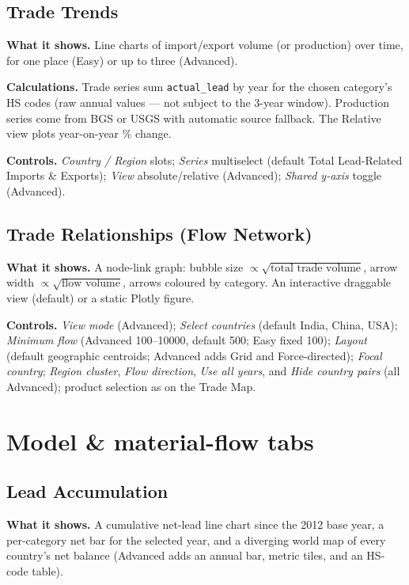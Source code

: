 \documentclass[11pt,a4paper]{article}
\newcommand{\code}[1]{\texttt{\small #1}}
\begin{document}
\subsection{Trade Trends}

\textbf{What it shows.} Line charts of import/export volume (or production) over
time, for one place (Easy) or up to three (Advanced).

\textbf{Calculations.} Trade series sum \code{actual\_lead} by year for the chosen
category's HS codes (raw annual values --- not subject to the 3-year window).
Production series come from BGS or USGS with automatic source fallback. The
Relative view plots year-on-year \% change.

\textbf{Controls.} \emph{Country / Region} slots; \emph{Series} multiselect
(default Total Lead-Related Imports \& Exports); \emph{View} absolute/relative
(Advanced); \emph{Shared y-axis} toggle (Advanced).

\subsection{Trade Relationships (Flow Network)}

\textbf{What it shows.} A node-link graph: bubble size
$\propto\sqrt{\text{total trade volume}}$, arrow width
$\propto\sqrt{\text{flow volume}}$, arrows coloured by category. An interactive
draggable view (default) or a static Plotly figure.

\textbf{Controls.} \emph{View mode} (Advanced); \emph{Select countries} (default
India, China, USA); \emph{Minimum flow} (Advanced 100--10000, default 500; Easy
fixed 100); \emph{Layout} (default geographic centroids; Advanced adds Grid and
Force-directed); \emph{Focal country}; \emph{Region cluster}, \emph{Flow
direction}, \emph{Use all years}, and \emph{Hide country pairs} (all Advanced);
product selection as on the Trade Map.

\section{Model \& material-flow tabs}

\subsection{Lead Accumulation}

\textbf{What it shows.} A cumulative net-lead line chart since the 2012 base year,
a per-category net bar for the selected year, and a diverging world map of every
country's net balance (Advanced adds an annual bar, metric tiles, and an HS-code
table).
\end{document}
